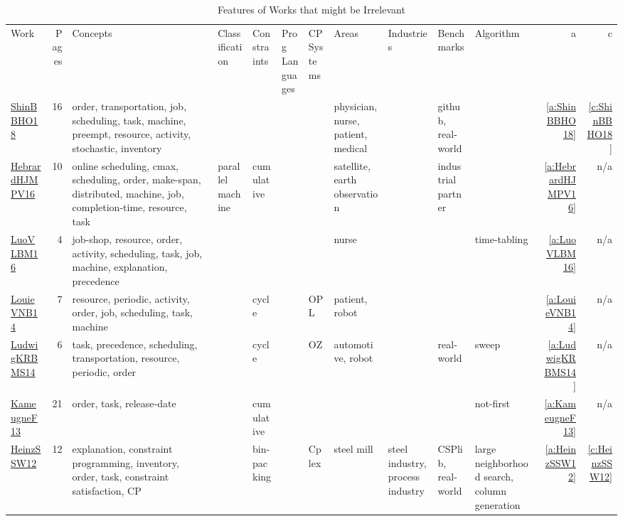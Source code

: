 {\scriptsize
\begin{longtable}{>{\raggedright\arraybackslash}p{3cm}r>{\raggedright\arraybackslash}p{4cm}p{1.5cm}p{2cm}p{1.5cm}p{1.5cm}p{1.5cm}p{1.5cm}p{2cm}p{1.5cm}rr}
\rowcolor{white}\caption{Features of Works that might be Irrelevant}\\ \toprule
\rowcolor{white}Work & Pages & Concepts & Classification & Constraints & \shortstack{Prog\\Languages} & \shortstack{CP\\Systems} & Areas & Industries & Benchmarks & Algorithm & a & c\\ \midrule\endhead
\bottomrule
\endfoot
\href{../works/ShinBBHO18.pdf}{ShinBBHO18}~\cite{ShinBBHO18} & 16 & order, transportation, job, scheduling, task, machine, preempt, resource, activity, stochastic, inventory &  &  &  &  & physician, nurse, patient, medical &  & github, real-world &  & \ref{a:ShinBBHO18} & \ref{c:ShinBBHO18}\\
\href{../works/HebrardHJMPV16.pdf}{HebrardHJMPV16}~\cite{HebrardHJMPV16} & 10 & online scheduling, cmax, scheduling, order, make-span, distributed, machine, job, completion-time, resource, task & parallel machine & cumulative &  &  & satellite, earth observation &  & industrial partner &  & \ref{a:HebrardHJMPV16} & n/a\\
\href{../works/LuoVLBM16.pdf}{LuoVLBM16}~\cite{LuoVLBM16} & 4 & job-shop, resource, order, activity, scheduling, task, job, machine, explanation, precedence &  &  &  &  & nurse &  &  & time-tabling & \ref{a:LuoVLBM16} & n/a\\
\href{../works/LouieVNB14.pdf}{LouieVNB14}~\cite{LouieVNB14} & 7 & resource, periodic, activity, order, job, scheduling, task, machine &  & cycle &  & OPL & patient, robot &  &  &  & \ref{a:LouieVNB14} & n/a\\
\href{../works/LudwigKRBMS14.pdf}{LudwigKRBMS14}~\cite{LudwigKRBMS14} & 6 & task, precedence, scheduling, transportation, resource, periodic, order &  & cycle &  & OZ & automotive, robot &  & real-world & sweep & \ref{a:LudwigKRBMS14} & n/a\\
\href{../works/KameugneF13.pdf}{KameugneF13}~\cite{KameugneF13} & 21 & order, task, release-date &  & cumulative &  &  &  &  &  & not-first & \ref{a:KameugneF13} & n/a\\
\href{../works/HeinzSSW12.pdf}{HeinzSSW12}~\cite{HeinzSSW12} & 12 & explanation, constraint programming, inventory, order, task, constraint satisfaction, CP &  & bin-packing &  & Cplex & steel mill & steel industry, process industry & CSPlib, real-world & large neighborhood search, column generation & \ref{a:HeinzSSW12} & \ref{c:HeinzSSW12}\\

\end{longtable}}
